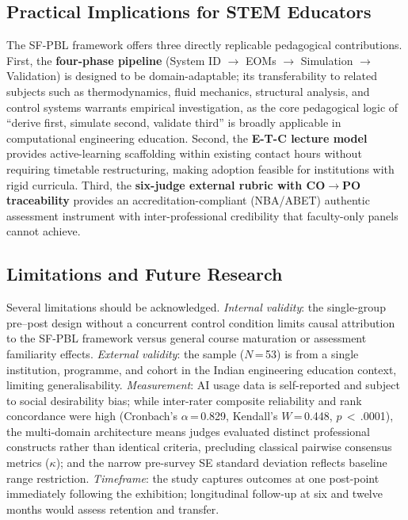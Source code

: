 \documentclass[utf8]{FrontiersinHarvard}
\begin{document}
\subsection{Practical Implications for STEM Educators}

The SF-PBL framework offers three directly replicable pedagogical
contributions. First, the \textbf{four-phase pipeline} (System ID
$\rightarrow$ EOMs $\rightarrow$ Simulation $\rightarrow$ Validation) is
{\color{blue} designed to be domain-adaptable; its transferability to related subjects such
as thermodynamics, fluid mechanics, structural analysis, and control systems
warrants empirical investigation, as the core pedagogical logic of ``derive
first, simulate second, validate third'' is broadly applicable in computational
engineering education.} Second, the \textbf{E-T-C lecture model} provides
active-learning scaffolding within existing contact hours without requiring
timetable restructuring, making adoption feasible for institutions with rigid
curricula. Third, the \textbf{six-judge external rubric with CO$\rightarrow$PO
traceability} provides an accreditation-compliant (NBA/ABET) authentic
assessment instrument with inter-professional credibility that faculty-only
panels cannot achieve.

\subsection{Limitations and Future Research}
\label{sec:limitations}

Several limitations should be acknowledged. \textit{Internal validity}: the
single-group pre--post design without a concurrent control condition limits
causal attribution to the SF-PBL framework versus general course maturation
or assessment familiarity effects. \textit{External validity}: the sample
($N$\,=\,53) is from a single institution, programme, and cohort in the
Indian engineering education context, limiting generalisability. 
\textit{Measurement}: AI usage data is self-reported and subject to social
desirability bias; {\color{blue} while inter-rater composite reliability and rank
concordance were high (Cronbach's $\alpha$\,=\,0.829, Kendall's $W$\,=\,0.448,
$p$\,$<$\,.0001), the multi-domain architecture means judges evaluated distinct
professional constructs rather than identical criteria, precluding classical
pairwise consensus metrics ($\kappa$); and the narrow pre-survey SE standard
deviation reflects baseline range restriction.} \textit{Timeframe}: the study
captures outcomes at one post-point immediately following the exhibition;
longitudinal follow-up at six and twelve months would assess retention
and transfer.
\end{document}
